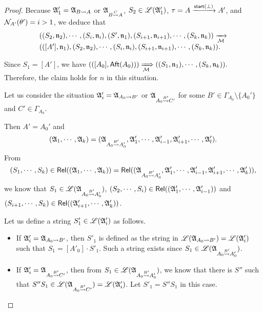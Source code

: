 \begin{proof}
Because ${\mathfrak{A} }'_1 = {\mathfrak{A} }_{B \rightsquigarrow A}$ or ${\mathfrak{A} }_{B \stackrel{C}{\rightsquigarrow} A}$, $S_2 \in {\mathscr{L} }({\mathfrak{A} }'_1)$,  $\tau = A \xrightarrow{{\mathsf{start} }(\bot)} A'$, and $\mathcal{N}_{A'}(\theta') = i > 1$, 
we deduce that 
$$
\begin{array}{l}
((S_2, \mathfrak{n}_2), \cdots, (S_i, \mathfrak{n}_i), (S', \mathfrak{n}_1), (S_{i+1}, \mathfrak{n}_{i+1}), \cdots, (S_k, \mathfrak{n}_k)) \xrightarrow[{\mathcal{M} }]{} \\
(([A'], \mathfrak{n}_1), (S_2, \mathfrak{n}_2), \cdots, (S_i, \mathfrak{n}_i), (S_{i+1}, \mathfrak{n}_{i+1}), \cdots, (S_k, \mathfrak{n}_k)).
\end{array}
$$ 

Since $S_1 = [A']$, we have
$(([A_0], {\sf Aft}(A_0))) \xRightarrow[{\mathcal{M} }]{} ((S_1, \mathfrak{n}_1), \cdots, (S_k, \mathfrak{n}_k)).$
%
Therefore, the claim holds for $n$ in this situation.


Let us consider the situation ${\mathfrak{A} }_i' = {\mathfrak{A} }_{A_0 \rightsquigarrow B'}$ or ${\mathfrak{A} }_{A_0 \stackrel{B'}{\rightsquigarrow} C'}$ for some $B' \in\Gamma_{A_0}\setminus\{A_0'\}$ and $C' \in \Gamma_{A_0}$. 

Then $A' = A_0'$ and
$$({\mathfrak{A} }_1, \cdots, {\mathfrak{A} }_k) = ({\mathfrak{A} }_{A_0\stackrel{B'}{\rightsquigarrow} A_0'}, {\mathfrak{A} }'_1, \cdots, {\mathfrak{A} }'_{i-1}, {\mathfrak{A} }'_{i+1}, \cdots, {\mathfrak{A} }'_l).$$ 
From 
%
$$(S_1, \cdots, S_k) \in \mathsf{Rel}(({\mathfrak{A} }_1, \cdots, {\mathfrak{A} }_k)) = \mathsf{Rel}(({\mathfrak{A} }_{A_0\stackrel{B'}{\rightsquigarrow} A_0'}, {\mathfrak{A} }'_1, \cdots, {\mathfrak{A} }'_{i-1}, {\mathfrak{A} }'_{i+1}, \cdots, {\mathfrak{A} }'_k)),$$ 
we know that $S_1 \in {\mathscr{L} }({\mathfrak{A} }_{A_0\stackrel{B'}{\rightsquigarrow} A_0'})$, $(S_2, \cdots, S_{i}) \in \mathsf{Rel}(({\mathfrak{A} }'_1, \cdots, {\mathfrak{A} }'_{i-1}))$ and $(S_{i+1}, \cdots, S_k) \in \mathsf{Rel}(({\mathfrak{A} }'_{i+1}, \cdots, {\mathfrak{A} }'_k))$. 

Let us define a string $S'_1 \in {\mathscr{L} }({\mathfrak{A} }'_i)$ as follows. 
\begin{itemize} 
\item If ${\mathfrak{A} }_i' = {\mathfrak{A} }_{A_0 \rightsquigarrow B'}$, then $S'_1$ is defined as the string in ${\mathscr{L} }({\mathfrak{A} }_{A_0 \rightsquigarrow B'})  = {\mathscr{L} }({\mathfrak{A} }'_i)$ such that $S_1 = [A'_0] \cdot S'_1$.  Such a string exists since $S_1 \in {\mathscr{L} }({\mathfrak{A} }_{A_0\stackrel{B'}{\rightsquigarrow} A_0'})$. 
%
\item If ${\mathfrak{A} }'_i = {\mathfrak{A} }_{A_0 \stackrel{B'}{\rightsquigarrow} C'}$, then from $S_1 \in {\mathscr{L} }({\mathfrak{A} }_{A_0\stackrel{B'}{\rightsquigarrow} A_0'})$, we know that there is $S''$ such that $S'' S_1 \in {\mathscr{L} }({\mathfrak{A} }_{A_0 \stackrel{B'}{\rightsquigarrow} C'}) = {\mathscr{L} }({\mathfrak{A} }'_i)$. Let $S'_1 = S''S_1$ in this case. 
\end{itemize}


\end{proof}
